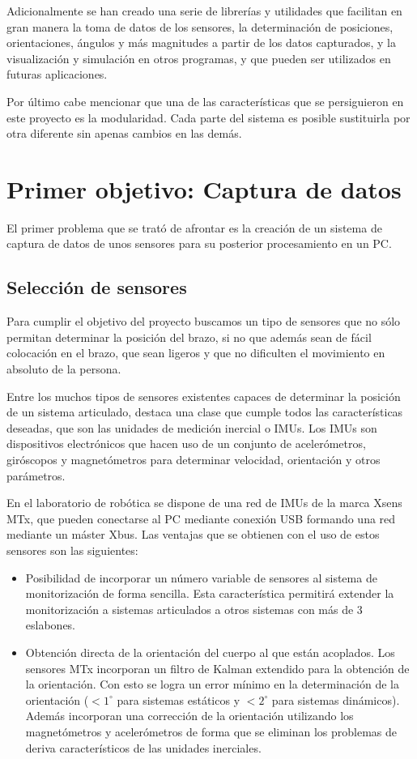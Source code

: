 \documentclass[12pt,a4paper]{article}
\begin{document}
Adicionalmente se han creado una serie de librerías y utilidades que facilitan en gran manera la toma de datos de los sensores, la determinación de posiciones, orientaciones, ángulos y más magnitudes a partir de los datos capturados, y la visualización y simulación en otros programas, y que pueden ser utilizados en futuras aplicaciones.

Por último cabe mencionar que una de las características que se persiguieron en este proyecto es la modularidad. Cada parte del sistema es posible sustituirla por otra diferente sin apenas cambios en las demás. 

\section{Primer objetivo: Captura de datos}

El primer problema que se trató de afrontar es la creación de un sistema de captura de datos de unos sensores para su posterior procesamiento en un PC. 

\subsection{Selección de sensores}

Para cumplir el objetivo del proyecto buscamos un tipo de sensores que no sólo permitan determinar la posición del brazo, si no que además sean de fácil colocación en el brazo, que sean ligeros y que no dificulten el movimiento en absoluto de la persona.

Entre los muchos tipos de sensores existentes capaces de determinar la posición de un sistema articulado, destaca una clase que cumple todos las características deseadas, que son las unidades de medición inercial o IMUs. Los IMUs son dispositivos electrónicos que hacen uso de un conjunto de acelerómetros, giróscopos y magnetómetros para determinar velocidad, orientación y otros parámetros.

En el laboratorio de robótica se dispone de una red de IMUs de la marca Xsens MTx, que pueden conectarse al PC mediante conexión USB formando una red mediante un máster Xbus. Las ventajas que se obtienen con el uso de estos sensores son las siguientes:

\begin{itemize}
\item Posibilidad de incorporar un número variable de sensores al sistema de monitorización de forma sencilla. Esta característica permitirá extender la monitorización a sistemas articulados a otros sistemas con más de 3 eslabones.

\item Obtención directa de la orientación del cuerpo al que están acoplados. Los sensores MTx incorporan un filtro de Kalman extendido para la obtención de la orientación. Con esto se logra un error mínimo en la determinación de la orientación ($< 1^\circ$ para sistemas estáticos y $<2^\circ$ para sistemas dinámicos). Además incorporan una corrección de la orientación utilizando los magnetómetros y acelerómetros de forma que se eliminan los problemas de deriva característicos de las unidades inerciales.
\end{itemize}
\end{document}
